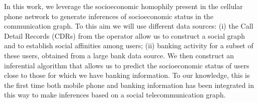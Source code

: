 In this work, we leverage the socioeconomic homophily present in the cellular phone network to generate inferences of socioeconomic status in the communication graph. To this aim we will use different data sources: (i) the Call Detail Records (CDRs) from the operator allow us to construct a social graph and to establish social affinities among users; (ii) banking activity for a subset of these users, obtained from a large bank data source. We then construct an inferential algorithm that allows us to predict the socioeconomic status of users close to those for which we have banking information. To our knowledge, this is the first time both mobile phone and banking information has been integrated in this way to make inferences based on a social telecommunication graph.


